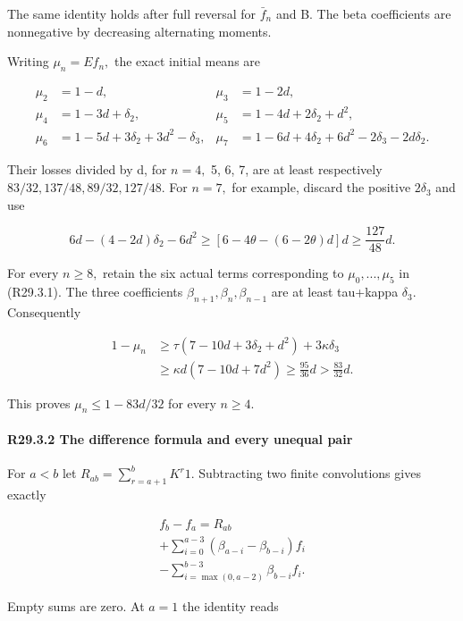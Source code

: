 The same identity holds after full reversal for \(\bar f_n\) and B. The beta coefficients are nonnegative by decreasing alternating moments.

Writing \(\mu_n=Ef_n,\allowbreak \) the exact initial means are

\[
\begin{aligned}
\mu_2&=1-d,&\mu_3&=1-2d,\\
\mu_4&=1-3d+\delta_2,&
\mu_5&=1-4d+2\delta_2+d^2,\\
\mu_6&=1-5d+3\delta_2+3d^2-\delta_3,&
\mu_7&=1-6d+4\delta_2+6d^2-2\delta_3-2d\delta_2.
\end{aligned}
\]

Their losses divided by d, for \(n=4,\allowbreak \) 5, 6, 7, are at least respectively
\(83/32,\allowbreak  137/48,\allowbreak  89/32,\allowbreak  127/48.\) For \(n=7,\allowbreak \) for example, discard the
positive \(2\delta_3\) and use

\[
6d-(4-2d)\delta_2-6d^2
\ge[6-4\theta-(6-2\theta)d]d
\ge\frac{127}{48}d.
\]

For every \(n\ge 8,\allowbreak \) retain the six actual terms corresponding to
\(\mu_0,\allowbreak ...,\allowbreak  \mu_5\) in (R29.3.1). The three coefficients \(\beta_{n+1},\allowbreak  \beta_n,\allowbreak  \beta_{n-1}\) are at least tau+kappa \(\delta_3.\) Consequently

\[
\begin{aligned}
1-\mu_n
&\ge\tau(7-10d+3\delta_2+d^2)+3\kappa \delta_3\\
&\ge\kappa d(7-10d+7d^2)
\ge\frac{95}{36}d>\frac{83}{32}d.
\end{aligned}
\tag{R29.3.2}
\]

This proves \(\mu_n\le 1-83d/32\) for every \(n\ge 4.\)

\paragraph{R29.3.2 The difference formula and every unequal pair}

For \(a<b\) let \(R_{ab}=\sum_{r=a+1}^bK^r1\). Subtracting two finite
convolutions gives exactly

\[
\begin{gathered}
f_b-f_a=R_{ab}\\
+\sum_{i=0}^{a-3}(\beta_{a-i}-\beta_{b-i})f_i\\
-\sum_{i=\max(0,a-2)}^{b-3}\beta_{b-i}f_i.
\end{gathered}\tag{R29.3.3}
\]

Empty sums are zero. At $a=1$ the identity reads

